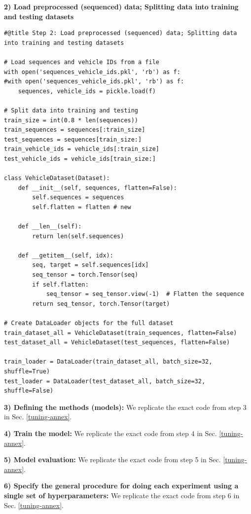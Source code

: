 \documentclass[journal,onecolumn]{IEEEtran}
\begin{document}
{\begin{appendices}
\textbf{2) Load preprocessed (sequenced) data; Splitting data into training and testing datasets}
\begin{verbatim}
#@title Step 2: Load preprocessed (sequenced) data; Splitting data into training and testing datasets

# Load sequences and vehicle IDs from a file
with open('sequences_vehicle_ids.pkl', 'rb') as f:
#with open('sequences_vehicle_ids.pkl', 'rb') as f:
    sequences, vehicle_ids = pickle.load(f)

# Split data into training and testing
train_size = int(0.8 * len(sequences))
train_sequences = sequences[:train_size]
test_sequences = sequences[train_size:]
train_vehicle_ids = vehicle_ids[:train_size]
test_vehicle_ids = vehicle_ids[train_size:]

class VehicleDataset(Dataset):
    def __init__(self, sequences, flatten=False):
        self.sequences = sequences
        self.flatten = flatten # new

    def __len__(self):
        return len(self.sequences)

    def __getitem__(self, idx):
        seq, target = self.sequences[idx]
        seq_tensor = torch.Tensor(seq)
        if self.flatten:
            seq_tensor = seq_tensor.view(-1)  # Flatten the sequence
        return seq_tensor, torch.Tensor(target)

# Create DataLoader objects for the full dataset
train_dataset_all = VehicleDataset(train_sequences, flatten=False)
test_dataset_all = VehicleDataset(test_sequences, flatten=False)

train_loader = DataLoader(train_dataset_all, batch_size=32, shuffle=True)
test_loader = DataLoader(test_dataset_all, batch_size=32, shuffle=False)
\end{verbatim}

\textbf{3) Defining the methods (models): } We replicate the exact code from step 3 in Sec. \ref{tuning-annex}.

\textbf{4) Train the model: } We replicate the exact code from step 4 in Sec. \ref{tuning-annex}.

\textbf{5) Model evaluation: } We replicate the exact code from step 5 in Sec. \ref{tuning-annex}.

\textbf{6) Specify the general procedure for doing each experiment using a single set of hyperparameters: } We replicate the exact code from step 6 in Sec. \ref{tuning-annex}.


\end{appendices}}
\end{document}
